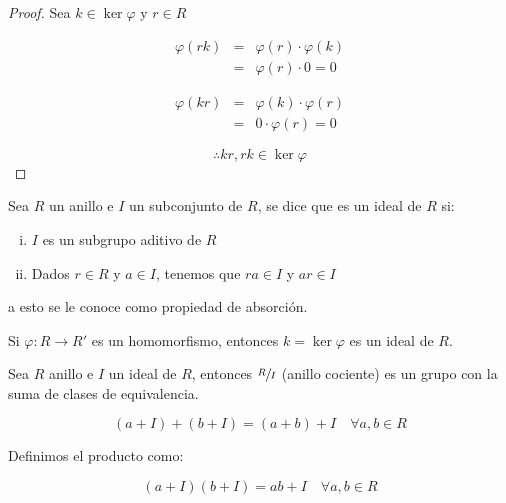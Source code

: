     \begin{proof}
        Sea $k \in \ker{\varphi}$ y $r \in R$

        \begin{eqnarray*}
            \varphi(rk) & = & \varphi(r) \cdot \varphi(k) \\
            & = & \varphi(r) \cdot 0 = 0
        \end{eqnarray*}

        \begin{eqnarray*}
            \varphi(kr) & = & \varphi(k) \cdot \varphi(r) \\
            & = & 0 \cdot \varphi(r) = 0
        \end{eqnarray*}

        \begin{equation*}
            \therefore kr, rk \in \ker{\varphi}
        \end{equation*}
    \end{proof}

    \begin{definicion}
        Sea $R$ un anillo e $I$ un subconjunto de $R$, se dice que es un ideal de $R$ si:

        \begin{enumerate}[i)]
            \item $I$ es un subgrupo aditivo de $R$
            \item Dados $r \in R$ y $a \in I$, tenemos que $ra \in I$ y $ar \in I$
        \end{enumerate}

        a esto se le conoce como propiedad de absorción.
    \end{definicion}

    \begin{corolario}
        Si $\varphi: R \to R'$ es un homomorfismo, entonces $k = \ker{\varphi}$ es un ideal de $R$.
    \end{corolario}

    \begin{definicion}
        Sea $R$ anillo e $I$ un ideal de $R$, entonces $\sfrac{R}{I}$ (anillo cociente) es un grupo con la suma de clases de equivalencia.

        \begin{equation}
            (a + I) + (b + I) = (a + b) + I \quad \forall a, b \in R
        \end{equation}
    \end{definicion}

    \begin{definicion}
        Definimos el producto como:

        \begin{equation}
            (a + I)(b + I) = ab + I \quad \forall a, b \in R
        \end{equation}
    \end{definicion}

